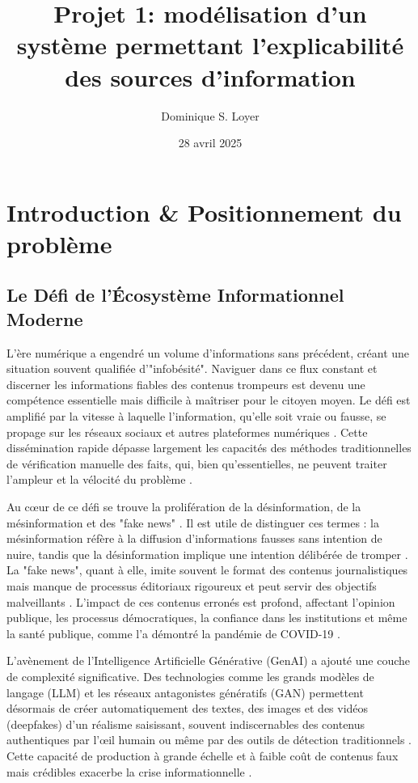 \documentclass[9pt,twocolumn,french]{article}
\date{28 avril 2025}
\title{Projet 1: modélisation d'un système permettant l'explicabilité des sources d'information}
\author{Dominique S. Loyer}
\affil[UQAM]{Projet 1 présenté au Professeur Hakim Lounis, dans le cadre d'un cours de doctorat, modélisation des problèmes complexes, DIC-9251}
\affil[@]{loyer.dominique@courrier.uqam.ca}
\begin{document}
\maketitle
\section{Introduction \& Positionnement du problème}

\subsection{Le Défi de l'Écosystème Informationnel Moderne}

L'ère numérique a engendré un volume d'informations sans précédent, créant une situation souvent qualifiée d'"infobésité". Naviguer dans ce flux constant et discerner les informations fiables des contenus trompeurs est devenu une compétence essentielle mais difficile à maîtriser pour le citoyen moyen. Le défi est amplifié par la vitesse à laquelle l'information, qu'elle soit vraie ou fausse, se propage sur les réseaux sociaux et autres plateformes numériques \citep{Loth2024, Chen2024Combating, Castillo2011}. Cette dissémination rapide dépasse largement les capacités des méthodes traditionnelles de vérification manuelle des faits, qui, bien qu'essentielles, ne peuvent traiter l'ampleur et la vélocité du problème \citep{Hagag2023The, Pescuma2025, Loth2024}.

Au cœur de ce défi se trouve la prolifération de la désinformation, de la mésinformation et des "fake news" \citep{Viviani2017, Loth2024, Zhou2022A, Sharma2021Combating}. Il est utile de distinguer ces termes : la mésinformation réfère à la diffusion d'informations fausses sans intention de nuire, tandis que la désinformation implique une intention délibérée de tromper \citep{Zhou2022A, Pescuma2025}. La "fake news", quant à elle, imite souvent le format des contenus journalistiques mais manque de processus éditoriaux rigoureux et peut servir des objectifs malveillants \citep{Zhou2022A, Sharma2021Combating}. L'impact de ces contenus erronés est profond, affectant l'opinion publique, les processus démocratiques, la confiance dans les institutions et même la santé publique, comme l'a démontré la pandémie de COVID-19 \citep{Viviani2017, Loth2024, Zhou2022A, de2026A}.

L'avènement de l'Intelligence Artificielle Générative (GenAI) a ajouté une couche de complexité significative. Des technologies comme les grands modèles de langage (LLM) et les réseaux antagonistes génératifs (GAN) permettent désormais de créer automatiquement des textes, des images et des vidéos (deepfakes) d'un réalisme saisissant, souvent indiscernables des contenus authentiques par l'œil humain ou même par des outils de détection traditionnels \citep{Loth2024, Chen2024Combating, Thibault2025A}. Cette capacité de production à grande échelle et à faible coût de contenus faux mais crédibles exacerbe la crise informationnelle \citep{Loth2024, Zhou2022A, Sharma2021Combating}.
\end{document}
